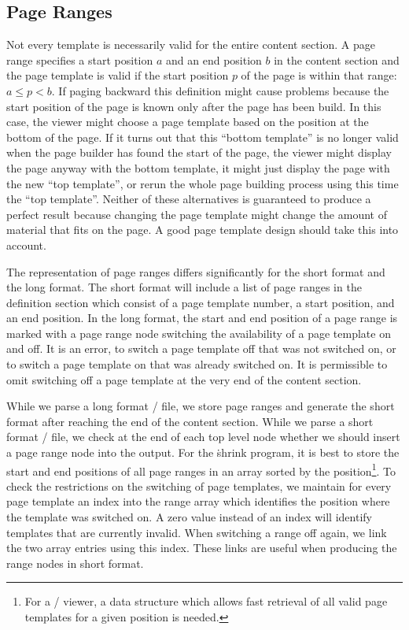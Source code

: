 \subsection{Page Ranges}\label{range}
Not every template is necessarily valid for the entire content
section.  A page range specifies a start position $a$ and an end
position $b$ in the content section and the page template is valid if
the start position $p$ of the page is within that range: $a\le p < b$.
If paging backward this definition might cause problems because the
start position of the page is known only after the page has been
build.  In this case, the viewer might choose a page template based on
the position at the bottom of the page. If it turns out that this ``bottom template''
is no longer valid when the page builder has found the start of the
page, the viewer might display the page anyway with the bottom
template, it might just display the page with the new ``top
template'', or rerun the whole page building process using this time
the ``top template''.  Neither of these alternatives is guaranteed to
produce a perfect result because changing the page template might
change the amount of material that fits on the page. A good page
template design should take this into account.

The representation of page ranges differs significantly for the short
format and the long format.  The short format will include a list of page
ranges in the definition section which consist of a page template number,
a start position, and an end position. In the long format, the start
and end position of a page
range is marked with a page range node switching the availability of a
page template on and off.  It is an error, to switch a page template
off that was not switched on, or to switch a page template on that was
already switched on.  It is permissible to omit switching off a page
template at the very end of the content section.

While we parse a long format \HINT/ file, we store page ranges and generate
the short format after reaching the end of the content section.
While we parse a short format \HINT/ file,
we check at the end of each top level node whether we should insert a
page range node into the output.
For the \.{shrink} program, it is best
to store the start and end positions of all page ranges
in an array sorted by the position\footnote*{For a \HINT/ viewer,
a data structure which allows fast retrieval of all
valid page templates for a given position is needed.}.
To check the restrictions on the switching of page templates, we
maintain for every page template an index into the range array
which identifies the position where the template was switched on.
A zero value instead of an index will identify templates that
are currently invalid. When switching a range off again, we
link the two array entries using this index. These links
are useful when producing the range nodes in short format.

